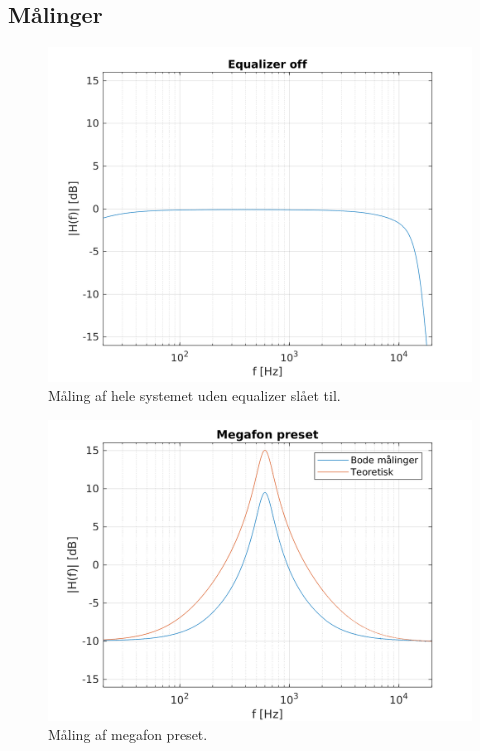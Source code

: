 %
%
%



\subsection{Målinger}

\begin{figure}[h]
\centering
\includegraphics[]{matlabdemo/test/eq_off.png}  
\caption{Måling af hele systemet uden equalizer slået til.}
\label{fig:eq_off1}
\end{figure}

\begin{figure}[h]
\centering
\includegraphics[]{matlabdemo/test/eq_megafon.png}
\caption{Måling af megafon preset.}
\end{figure}

